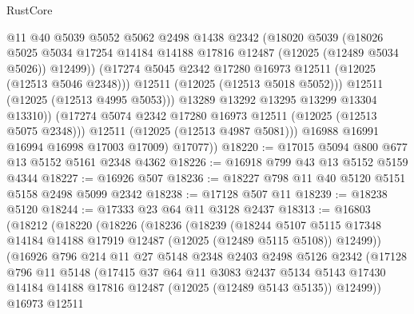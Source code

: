\begin{lexlean}{RustCore}
\begin{coremodule}
                    @11
                    @40
                    @5039
                    @5052
                    @5062
                    @2498
                    @1438
                    @2342
                    (@18020
                      @5039
                      (@18026
                        @5025
                        @5034
                        @17254
                        @14184
                        @14188
                        @17816
                        @12487
                        (@12025 (@12489 @5034 @5026))
                        @12499))
                    (@17274 @5045 @2342 @17280 @16973 @12511 (@12025 (@12513 @5046 @2348)))
                    @12511
                    (@12025 (@12513 @5018 @5052)))
                  @12511
                  (@12025 (@12513 @4995 @5053)))
                @13289
                @13292
                @13295
                @13299
                @13304
                @13310))
            (@17274 @5074 @2342 @17280 @16973 @12511 (@12025 (@12513 @5075 @2348)))
            @12511
            (@12025 (@12513 @4987 @5081)))
          @16988
          @16991
          @16994
          @16998
          @17003
          @17009)
        @17077))
@18220 := @17015 @5094 @800 @677 @13 @5152 @5161 @2348 @4362
@18226 := @16918 @799 @43 @13 @5152 @5159 @4344
@18227 := @16926 @507
@18236 := @18227 @798 @11 @40 @5120 @5151 @5158 @2498 @5099 @2342
@18238 := @17128 @507 @11
@18239 := @18238 @5120
@18244 := @17333 @23 @64 @11 @3128 @2437
@18313 := @16803
    (@18212
      (@18220
        (@18226
          (@18236
            (@18239
              (@18244
                @5107
                @5115
                @17348
                @14184
                @14188
                @17919
                @12487
                (@12025 (@12489 @5115 @5108))
                @12499))
            (@16926
              @796
              @214
              @11
              @27
              @5148
              @2348
              @2403
              @2498
              @5126
              @2342
              (@17128
                @796
                @11
                @5148
                (@17415
                  @37
                  @64
                  @11
                  @3083
                  @2437
                  @5134
                  @5143
                  @17430
                  @14184
                  @14188
                  @17816
                  @12487
                  (@12025 (@12489 @5143 @5135))
                  @12499))
              @16973
              @12511

\end{coremodule}
\end{lexlean}
